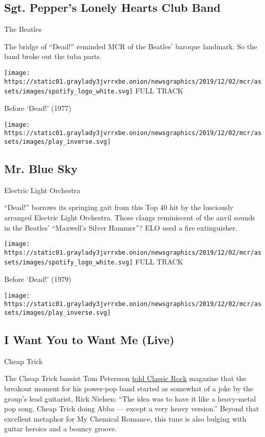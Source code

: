 \hypertarget{sgt-peppers-lonely-hearts-club-band}{%
\subsection{Sgt. Pepper's Lonely Hearts Club
Band}\label{sgt-peppers-lonely-hearts-club-band}}

The Beatles

The bridge of ``Dead!'' reminded MCR of the Beatles' baroque landmark.
So the band broke out the tuba parts.

\href{https://open.spotify.com/track/4fUKE8EULjQdHF4zb0M8FO?si=2oeHywTyQSqhVkJTTGHgcQ}{}

\texttt{[image: https://static01.graylady3jvrrxbe.onion/newsgraphics/2019/12/02/mcr/assets/images/spotify\_logo\_white.svg]}
FULL TRACK

Before `Dead!' (1977)

\texttt{[image: https://static01.graylady3jvrrxbe.onion/newsgraphics/2019/12/02/mcr/assets/images/play\_inverse.svg]}

\hypertarget{mr-blue-sky}{%
\subsection{Mr. Blue Sky}\label{mr-blue-sky}}

Electric Light Orchestra

``Dead!'' borrows its springing gait from this Top 40 hit by the
lusciously arranged Electric Light Orchestra. Those clangs reminiscent
of the anvil sounds in the Beatles' ``Maxwell's Silver Hammer''? ELO
used a fire extinguisher.

\href{https://open.spotify.com/track/2RlgNHKcydI9sayD2Df2xp?si=RyhYfm8iQBmVz7Ikj0QnUg}{}

\texttt{[image: https://static01.graylady3jvrrxbe.onion/newsgraphics/2019/12/02/mcr/assets/images/spotify\_logo\_white.svg]}
FULL TRACK

Before `Dead!' (1979)

\texttt{[image: https://static01.graylady3jvrrxbe.onion/newsgraphics/2019/12/02/mcr/assets/images/play\_inverse.svg]}

\hypertarget{i-want-you-to-want-me-live}{%
\subsection{I Want You to Want Me
(Live)}\label{i-want-you-to-want-me-live}}

Cheap Trick

The Cheap Trick bassist Tom Petersson
\href{https://www.loudersound.com/features/the-story-behind-the-song-i-want-you-to-want-me-by-cheap-trick}{told
Classic Rock} magazine that the breakout moment for his power-pop band
started as somewhat of a joke by the group's lead guitarist, Rick
Nielsen: ``The idea was to have it like a heavy-metal pop song. Cheap
Trick doing Abba --- except a very heavy version.'' Beyond that
excellent metaphor for My Chemical Romance, this tune is also bulging
with guitar heroics and a bouncy groove.


